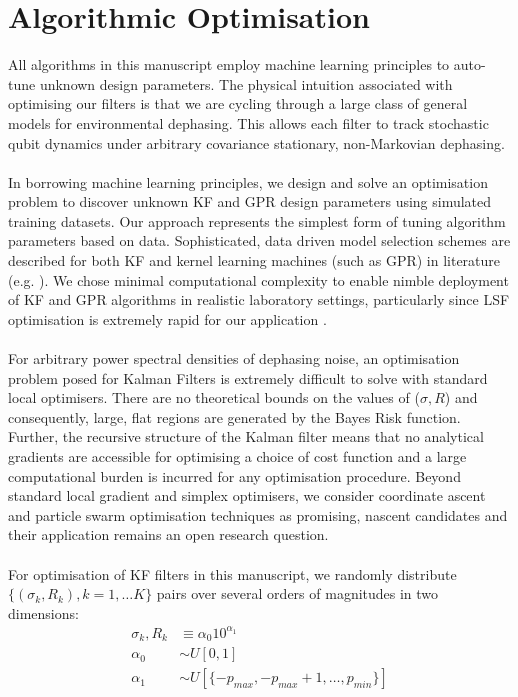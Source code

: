 \section{Algorithmic Optimisation \label{sec:main:Optimisation}}

All algorithms in this manuscript employ machine learning principles to auto-tune unknown design parameters. The physical intuition associated with optimising our filters is that we are cycling through a large class of general models for environmental dephasing. This allows each filter to track stochastic qubit dynamics under arbitrary covariance stationary, non-Markovian dephasing. 
\\
\\
In borrowing machine learning principles, we design and solve an optimisation problem to discover unknown KF and GPR design parameters using simulated training datasets. Our approach represents the simplest form of tuning algorithm parameters based on data. Sophisticated, data driven model selection schemes are described for both KF and kernel learning machines (such as GPR) in literature (e.g. \cite{arlot2009data, vu2015understanding}). We chose minimal computational complexity to enable nimble deployment of KF and GPR algorithms in realistic laboratory settings, particularly since LSF optimisation is extremely rapid for our application \cite{mavadia2017}.
\\
\\
For arbitrary power spectral densities of dephasing noise, an optimisation problem posed for Kalman Filters is extremely difficult to solve with standard local optimisers. There are no theoretical bounds on the values of ($\sigma, R$) and consequently, large, flat regions are generated by the Bayes Risk function. Further, the recursive structure of the Kalman filter means that no analytical gradients are accessible for optimising a choice of cost function and a large computational burden is incurred for any optimisation procedure. Beyond standard local gradient and simplex optimisers, we consider coordinate ascent \cite{abbeel2005} and particle swarm optimisation techniques \cite{robertson2017particle} as promising, nascent candidates and their application remains an open research question. 
\\  
\\
For optimisation of KF filters in this manuscript, we randomly distribute $\{(\sigma_{k}, R_{k}), k=1, \hdots K \}$ pairs over several orders of magnitudes in two dimensions:
\begin{align}
\sigma_k, R_k &\equiv \alpha_0 10^{\alpha_1} \\
\alpha_0 & \sim U[0, 1]\\
\alpha_1 & \sim U[\{ -p_{max}, -p_{max} + 1,  \hdots,  p_{min}\}]
\end{align}
